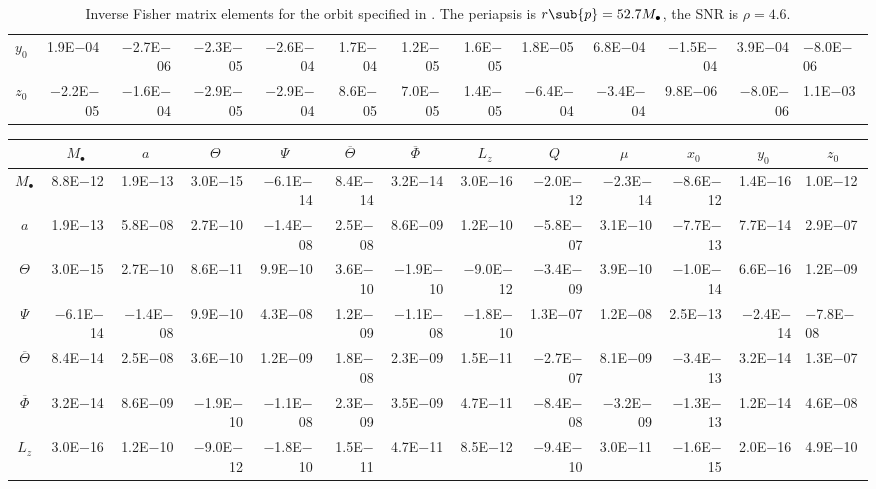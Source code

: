 \begin{sidewaystable}[htbp]
\begin{tabular}{crrrrrrrrrrr}
$y_0$ & 1.9E$-$04 & $-$2.7E$-$06 & $-$2.3E$-$05 & $-$2.6E$-$04 & 1.7E$-$04 & 1.2E$-$05 & 1.6E$-$05 & 1.8E$-$05 & 6.8E$-$04 & $-$1.5E$-$04 & 3.9E$-$04 & $-$8.0E$-$06 \\
$z_0$ & $-$2.2E$-$05 & $-$1.6E$-$04 & $-$2.9E$-$05 & $-$2.9E$-$04 & 8.6E$-$05 & 7.0E$-$05 & 1.4E$-$05 & $-$6.4E$-$04 & $-$3.4E$-$04 & 9.8E$-$06 & $-$8.0E$-$06 & 1.1E$-$03 \\
\bottomrule
\end{tabular}
\caption{Inverse Fisher matrix elements for the orbit specified in . The periapsis is $r\sub{p} = 52.7 M_\bullet$, the SNR is $\rho = 4.6$.}
\label{tab:Fisher_3}
\end{sidewaystable}
\begin{sidewaystable}[htbp]\squeezetable
\centering
\begin{tabular}{crrrrrrrrrrr}
\toprule
 &  &  &  &  &  &  &  &  &  &  &  &  \\ \midrule 
$M_\bullet$ & 8.8E$-$12 & 1.9E$-$13 & 3.0E$-$15 & $-$6.1E$-$14 & 8.4E$-$14 & 3.2E$-$14 & 3.0E$-$16 & $-$2.0E$-$12 & $-$2.3E$-$14 & $-$8.6E$-$12 & 1.4E$-$16 & 1.0E$-$12 \\
$a$ & 1.9E$-$13 & 5.8E$-$08 & 2.7E$-$10 & $-$1.4E$-$08 & 2.5E$-$08 & 8.6E$-$09 & 1.2E$-$10 & $-$5.8E$-$07 & 3.1E$-$10 & $-$7.7E$-$13 & 7.7E$-$14 & 2.9E$-$07 \\
$\Theta$ & 3.0E$-$15 & 2.7E$-$10 & 8.6E$-$11 & 9.9E$-$10 & 3.6E$-$10 & $-$1.9E$-$10 & $-$9.0E$-$12 & $-$3.4E$-$09 & 3.9E$-$10 & $-$1.0E$-$14 & 6.6E$-$16 & 1.2E$-$09 \\
$\Psi$ & $-$6.1E$-$14 & $-$1.4E$-$08 & 9.9E$-$10 & 4.3E$-$08 & 1.2E$-$09 & $-$1.1E$-$08 & $-$1.8E$-$10 & 1.3E$-$07 & 1.2E$-$08 & 2.5E$-$13 & $-$2.4E$-$14 & $-$7.8E$-$08 \\
$\overline{\Theta}$ & 8.4E$-$14 & 2.5E$-$08 & 3.6E$-$10 & 1.2E$-$09 & 1.8E$-$08 & 2.3E$-$09 & 1.5E$-$11 & $-$2.7E$-$07 & 8.1E$-$09 & $-$3.4E$-$13 & 3.2E$-$14 & 1.3E$-$07 \\
$\overline{\Phi}$ & 3.2E$-$14 & 8.6E$-$09 & $-$1.9E$-$10 & $-$1.1E$-$08 & 2.3E$-$09 & 3.5E$-$09 & 4.7E$-$11 & $-$8.4E$-$08 & $-$3.2E$-$09 & $-$1.3E$-$13 & 1.2E$-$14 & 4.6E$-$08 \\
$L_z$ & 3.0E$-$16 & 1.2E$-$10 & $-$9.0E$-$12 & $-$1.8E$-$10 & 1.5E$-$11 & 4.7E$-$11 & 8.5E$-$12 & $-$9.4E$-$10 & 3.0E$-$11 & $-$1.6E$-$15 & 2.0E$-$16 & 4.9E$-$10 \\

\end{tabular}
\end{sidewaystable}
